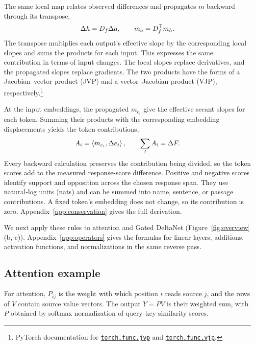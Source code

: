 The same local map relates observed differences and propagates $m$ backward through its transpose,
\begin{equation}
\Delta h=D_f\Delta a,
\qquad m_a=D_f^\top m_h.
\label{eq:reverse-contribution}
\end{equation}
The transpose multiplies each output's effective slope by the corresponding local slopes and sums the products for each input. This expresses the same contribution in terms of input changes. The local slopes replace derivatives, and the propagated slopes replace gradients. The two products have the forms of a Jacobian--vector product (JVP) and a vector--Jacobian product (VJP), respectively.\footnote{PyTorch documentation for \href{https://docs.pytorch.org/docs/2.14/generated/torch.func.jvp.html}{\texttt{torch.func.jvp}} and \href{https://docs.pytorch.org/docs/2.14/generated/torch.func.vjp.html}{\texttt{torch.func.vjp}}.}

At the input embeddings, the propagated $m_{e_i}$ give the effective secant slopes for each token. Summing their products with the corresponding embedding displacements yields the token contributions,
\begin{equation}
A_i=\left\langle m_{e_i},\Delta e_i\right\rangle,
\qquad \sum_i A_i=\Delta F.
\label{eq:attribution}
\end{equation}
Every backward calculation preserves the contribution being divided, so the token scores add to the measured response-score difference. Positive and negative scores identify support and opposition across the chosen response span. They use natural-log units (nats) and can be summed into name, sentence, or passage contributions. A fixed token's embedding does not change, so its contribution is zero. Appendix~\ref{app:conservation} gives the full derivation.

We next apply these rules to attention and Gated DeltaNet (Figure~\ref{fig:overview}(b, c)). Appendix~\ref{app:operators} gives the formulas for linear layers, additions, activation functions, and normalizations in the same reverse pass.

\subsection{Attention example}
\label{sec:attention}
For attention, $P_{ij}$ is the weight with which position $i$ reads source $j$, and the rows of $V$ contain source value vectors. The output $Y=PV$ is their weighted sum, with $P$ obtained by softmax normalization of query--key similarity scores.


